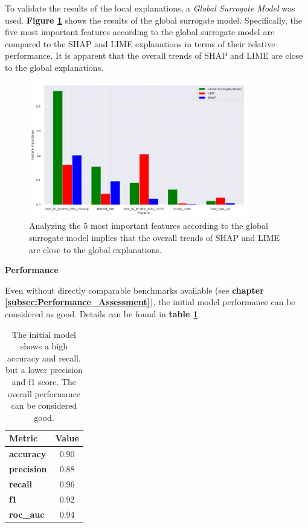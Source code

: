 To validate the results of the local explanations, a \textit{Global Surrogate Model} was used. \textbf{Figure \ref{fig:Global_Surrogate}} shows the results of the global surrogate model. Specifically, the five most important features according to the global surrogate model are compared to the SHAP and LIME explanations in terms of their relative performance.
It is apparent that the overall trends of SHAP and LIME are close to the global explanations.

\begin{figure}[h]
    \centering
    \caption{Global Surrogate Model compared to SHAP and LIME}
    \includegraphics[width=0.85\textwidth]{images/CHXX_UPDATE_Surrogate_SHAP_LIME_combined.png}
    \caption*{Analyzing the 5 most important features according to the global surrogate model implies that the overall trends of SHAP and LIME are close to the global explanations.}
    \label{fig:Global_Surrogate}
\end{figure}

\textbf{Performance}

Even without directly comparable benchmarks available (see \textbf{chapter \ref{subsec:Performance_Assessment}}), the initial model performance can be considered as good. Details can be found in \textbf{table \ref{tab:initial_model_performance_results_1}}.

\begin{table}[h]
    \centering
    \caption{Metrics \#1: Initial Model}
    \begin{tabular}{l c}
    \toprule
    \textbf{Metric} & \textbf{Value} \\
    \midrule
    \textbf{accuracy} & 0.90 \\
    \textbf{precision} & 0.88 \\
    \textbf{recall} & 0.96 \\
    \textbf{f1} & 0.92 \\
    \textbf{roc\_auc} & 0.94 \\
    \bottomrule
    \end{tabular}
    \caption*{The initial model shows a high accuracy and recall, but a lower precision and f1 score. The overall performance can be considered good.}
    \label{tab:initial_model_performance_results_1}
\end{table}

